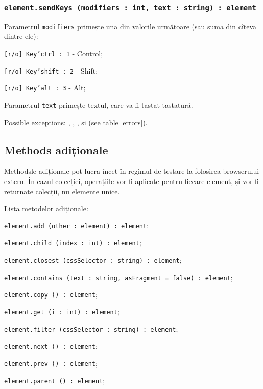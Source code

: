 \subsubsection{\texttt{element.sendKeys (modifiers : int, text : string) : element}}

Parametrul \texttt{modifiers} primește una din valorile următoare (sau suma din cîteva dintre ele):
\begin{icItems}
	\item \texttt{[r/o] Key'ctrl : 1} - Control;
	\item \texttt{[r/o] Key'shift : 2} - Shift;
	\item \texttt{[r/o] Key'alt : 3} - Alt;
\end{icItems}

Parametrul \texttt{text} primește textul, care va fi tastat tastatură.

Possible exceptions: , , ,   și  (see table \ref{errors}).

\subsection{Methods adiționale}

Methodsle adiționale pot lucra încet în regimul de testare la folosirea browserului extern. În cazul colecției, operațiile vor fi aplicate pentru fiecare element, și vor fi returnate colecții, nu elemente unice. 

Lista metodelor adiționale:
\begin{icItems}
	\item \texttt{element.add (other : element) : element};
	\item \texttt{element.child (index : int) : element};
	\item \texttt{element.closest (cssSelector : string) : element};
	\item \texttt{element.contains (text : string, asFragment = false) : element};
	\item \texttt{element.copy () : element};
	\item \texttt{element.get (i : int) : element};
	\item \texttt{element.filter (cssSelector : string) : element};
	\item \texttt{element.next () : element};
	\item \texttt{element.prev () : element};
	\item \texttt{element.parent () : element};
\end{icItems}

